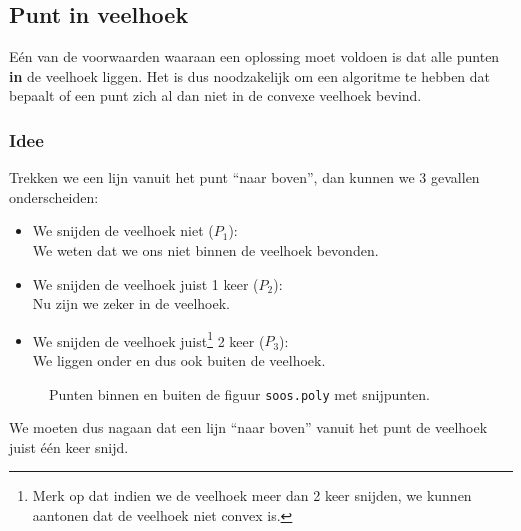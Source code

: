 \subsection{Punt in veelhoek}
\label{sub:algo-pt-in-poly}
Eén van de voorwaarden waaraan een oplossing moet voldoen is dat alle punten \textbf{in} de veelhoek liggen. Het is dus noodzakelijk om een algoritme te hebben dat bepaalt of een punt zich al dan niet in de convexe veelhoek bevind.
\subsubsection{Idee}
Trekken we een lijn vanuit het punt ``naar boven'', dan kunnen we 3 gevallen onderscheiden:
\begin{itemize}
\item We snijden de veelhoek niet ($P_{1}$): \\
		We weten dat we ons niet binnen de veelhoek bevonden.
\item We snijden de veelhoek juist 1 keer ($P_{2}$):\\
		Nu zijn we zeker in de veelhoek. 
\item We snijden de veelhoek juist\footnote{Merk op dat indien we de veelhoek meer dan 2 keer snijden, we kunnen aantonen dat de veelhoek niet convex is.} 2 keer ($P_{3}$):\\
		We liggen onder en dus ook buiten de veelhoek.
\end{itemize}

\begin{center}
\begin{figure}[H]
\centering
{}
\caption{Punten binnen en buiten de figuur \texttt{soos.poly} met snijpunten.}
\end{figure}
\end{center}
We moeten dus nagaan dat een lijn ``naar boven'' vanuit het punt de veelhoek
juist één keer snijd.


